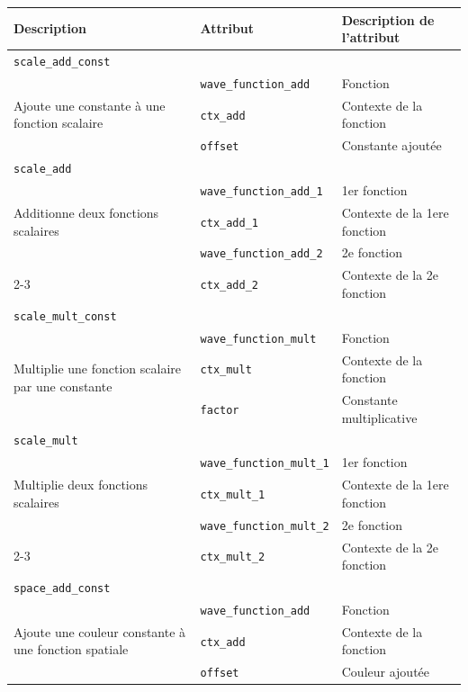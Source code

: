 \begin{table}[H]
\centering
\begin{tabular}{p{5.5cm} l p{5.5cm}}
\hline
\textbf{Description} & \textbf{Attribut} & \textbf{Description de l'attribut} \\
\hline

\multicolumn{3}{l}{\texttt{scale\_add\_const}} \\
\hline
\multirow{3}{5cm}{Ajoute une constante à une fonction scalaire} &
\texttt{wave\_function\_add} & Fonction \\
\cline{2-3}
 & \texttt{ctx\_add} & Contexte de la fonction \\
\cline{2-3}
 & \texttt{offset} & Constante ajoutée \\
\hline

\multicolumn{3}{l}{\texttt{scale\_add}} \\
\hline
\multirow{3}{5cm}{Additionne deux fonctions scalaires} &
\texttt{wave\_function\_add\_1} & 1er fonction \\
\cline{2-3}
 & \texttt{ctx\_add\_1} & Contexte de la 1ere fonction \\
\cline{2-3}
 & \texttt{wave\_function\_add\_2} & 2e fonction \\
\cline{2-3}
 & \texttt{ctx\_add\_2} & Contexte de la 2e fonction \\
\hline

\multicolumn{3}{l}{\texttt{scale\_mult\_const}} \\
\hline
\multirow{3}{5cm}{Multiplie une fonction scalaire par une constante} &
\texttt{wave\_function\_mult} & Fonction \\
\cline{2-3}
 & \texttt{ctx\_mult} & Contexte de la fonction \\
\cline{2-3}
 & \texttt{factor} & Constante multiplicative \\
\hline

\multicolumn{3}{l}{\texttt{scale\_mult}} \\
\hline
\multirow{3}{5cm}{Multiplie deux fonctions scalaires} &
\texttt{wave\_function\_mult\_1} & 1er fonction \\
\cline{2-3}
 & \texttt{ctx\_mult\_1} & Contexte de la 1ere fonction \\
\cline{2-3}
 & \texttt{wave\_function\_mult\_2} & 2e fonction \\
\cline{2-3}
 & \texttt{ctx\_mult\_2} & Contexte de la 2e fonction \\
\hline

\multicolumn{3}{l}{\texttt{space\_add\_const}} \\
\hline
\multirow{3}{5cm}{Ajoute une couleur constante à une fonction spatiale} &
\texttt{wave\_function\_add} & Fonction  \\
\cline{2-3}
 & \texttt{ctx\_add} & Contexte de la fonction \\
\cline{2-3}
 & \texttt{offset} & Couleur ajoutée \\
\hline


\end{tabular}
\end{table}
